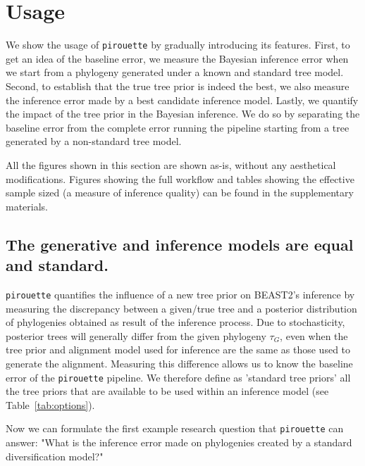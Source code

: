 \section{Usage}

We show the usage of \verb;pirouette; by gradually introducing
its features.
First, to get an idea of the baseline error, 
we measure the Bayesian inference error when we start from a phylogeny 
generated under a known and standard tree model.
Second, to establish that the true tree prior is indeed the best, 
we also measure the inference error made by a
best candidate inference model.
Lastly, we quantify the impact of the tree prior in the Bayesian inference. 
We do so by separating the baseline error from the complete error 
running the pipeline starting from a tree generated by a non-standard tree model.

All the figures shown in this section are shown as-is, without any
aesthetical modifications. Figures showing the full workflow 
and tables showing the effective sample sized (a measure
of inference quality) can be found in the supplementary materials.

\subsection{The generative and inference models are equal and standard.}

\verb;pirouette; quantifies the influence of a new tree prior on BEAST2's 
inference by measuring the discrepancy between a given/true tree and a posterior 
distribution of phylogenies obtained as result of the inference process. 
Due to stochasticity, posterior trees will generally differ from the given 
phylogeny $\tau_{\mathit{G}}$, even when the tree 
prior and alignment model used for inference are the same as those 
used to generate the alignment.
Measuring this difference allows us to know the baseline error
of the \verb;pirouette; pipeline. We therefore define as 'standard tree priors' 
all the tree priors that are available 
to be used within an inference model (see Table~\ref{tab:options}).

Now we can formulate the first example research question that \verb;pirouette; 
can answer: "What is the inference error made on phylogenies created by a 
standard diversification model?"

